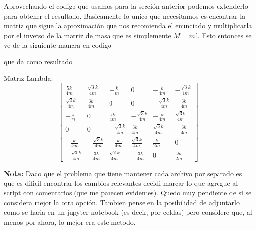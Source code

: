 \documentclass[12pt]{amsart}
\begin{document}
  \section{}

  Aprovechando el codigo que usamos para la sección anterior podemos extenderlo para obtener el resultado. Basicamente lo unico que necesitamos es encontrar la matriz que sigue la aproximación que nos recomienda el enunciado y multiplicarla por el inverso de la matriz de masa que es simplemente $M = m\mathbb{I}$. Esto entonces se ve de la siguiente manera en codigo

  

  que da como resultado:

  Matriz Lambda:
  \begin{equation}
    \left[\begin{matrix}\frac{5 k}{4 m} & \frac{\sqrt{3} k}{4 m} & - \frac{k}{m} & 0 & - \frac{k}{4 m} & - \frac{\sqrt{3} k}{4 m}\\\frac{\sqrt{3} k}{4 m} & \frac{3 k}{4 m} & 0 & 0 & - \frac{\sqrt{3} k}{4 m} & - \frac{3 k}{4 m}\\- \frac{k}{m} & 0 & \frac{5 k}{4 m} & - \frac{\sqrt{3} k}{4 m} & - \frac{k}{4 m} & \frac{\sqrt{3} k}{4 m}\\0 & 0 & - \frac{\sqrt{3} k}{4 m} & \frac{3 k}{4 m} & \frac{\sqrt{3} k}{4 m} & - \frac{3 k}{4 m}\\- \frac{k}{4 m} & - \frac{\sqrt{3} k}{4 m} & - \frac{k}{4 m} & \frac{\sqrt{3} k}{4 m} & \frac{k}{2 m} & 0\\- \frac{\sqrt{3} k}{4 m} & - \frac{3 k}{4 m} & \frac{\sqrt{3} k}{4 m} & - \frac{3 k}{4 m} & 0 & \frac{3 k}{2 m}\end{matrix}\right]
  \end{equation}

  \textbf{Nota:} Dado que el problema que tiene mantener cada archivo por separado es que es dificil encontrar los cambios relevantes decidi marcar lo que agregue al script con comentarios (que me parecen evidentes). Quedo muy pendiente de si se considera mejor la otra opción. Tambien pense en la posibilidad de adjuntarlo como se haria en un jupyter notebook (es decir, por celdas) pero considere que, al menos por ahora, lo mejor era este metodo.

  \section{}
\end{document}
